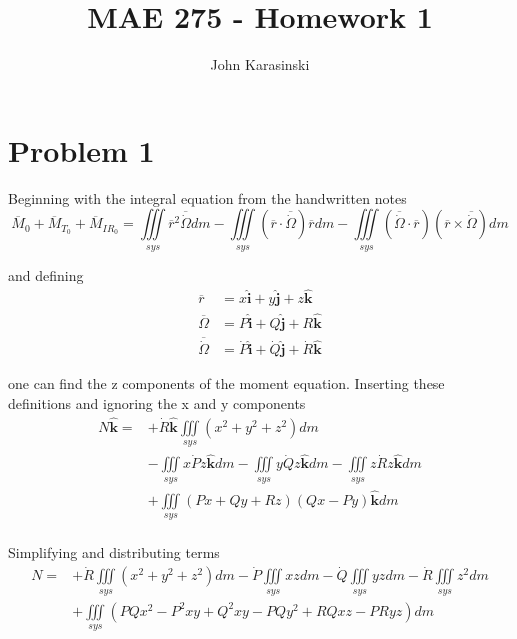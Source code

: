 \documentclass[a4paper]{article}
\title{MAE 275 - Homework 1}
\author{John Karasinski}
\newcommand{\ihat}{\boldsymbol{\hat{\textbf{i}}}}
\newcommand{\jhat}{\boldsymbol{\hat{\textbf{j}}}}
\newcommand{\khat}{\boldsymbol{\hat{\textbf{k}}}}
\begin{document}
\maketitle


\section{Problem 1}
Beginning with the integral equation from the handwritten notes
\begin{equation*}
\overline{M}_0 + \overline{M}_{T_0} + \overline{M}_{{IR}_0} = 
\iiint\limits_{sys} \overline{r}^2 \overline{\dot{\Omega}} dm - 
\iiint\limits_{sys} (\overline{r} \cdot \overline{\dot{\Omega}}) \overline{r} dm -
\iiint\limits_{sys} (\overline{\dot{\Omega}} \cdot \overline{r}) (\overline{r} \times \overline{\dot{\Omega}} ) dm
\end{equation*}

\noindent and defining
\begin{equation*}
\begin{split}
\overline{r}            &= x \ihat + y \jhat + z \khat \\
\overline{\Omega}       &= P \ihat + Q \jhat + R \khat \\
\overline{\dot{\Omega}} &= \dot{P} \ihat + \dot{Q} \jhat + \dot{R} \khat
\end{split}
\end{equation*}

\noindent one can find the z components of the moment equation. Inserting these definitions and ignoring the x and y components
\begin{equation*}
\begin{split}
N \khat =  & + \dot{R} \khat \iiint\limits_{sys} (x^2 + y^2 + z^2) dm \\
           &            - \iiint\limits_{sys} x \dot{P} z \khat dm  
                        - \iiint\limits_{sys} y \dot{Q} z \khat dm  
                        - \iiint\limits_{sys} z \dot{R} z \khat dm \\
           &            + \iiint\limits_{sys} (P x + Q y + R z)(Q x - P y) \khat dm \\
\end{split}
\end{equation*}


\noindent Simplifying and distributing terms
\begin{equation*}
\begin{split}
N =  & +\dot{R} \iiint\limits_{sys} (x^2 + y^2 + z^2) dm
            - \dot{P} \iiint\limits_{sys} x z dm
            - \dot{Q} \iiint\limits_{sys} y z dm
            - \dot{R} \iiint\limits_{sys} z^2 dm \\
          & + \iiint\limits_{sys} (P Q x^2 - P^2 x y + Q^2 x y - P Q y^2 + R Q x z - P R y z) dm \\
\end{split}
\end{equation*}
\end{document}
